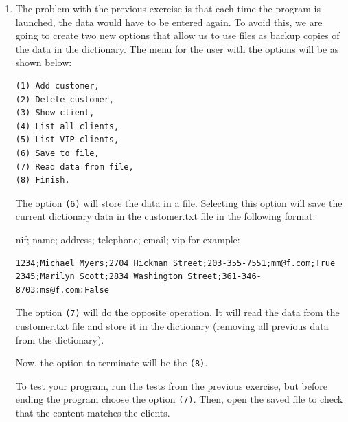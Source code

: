 \documentclass[
  fontsize=10pt,
  a4paper,
]{scrartcl}
\begin{document}
\begin{enumerate}
{def listCustomers(customers):
    print('List of customers')
    for key, value in customers.items():
        print(key, value['name'])
        
def listVIPCustomers(customers):
    print('List of VIP customers')
    for key, value in customers.items():
        if value['vip']:
            print(key, value['nombre'])

def main():
    customers = {}
    option = ''

    while option != '6':
        if option == '1':
            enterData(customers)
        if option == '2':
            deleteCustomer(customers)
        if option == '3':
            showCustomer(customers)
        if option == '4':
            listCustomers(customers)
        if option == '5':
            listVIPCustomers(customers)
        option = input('Option menu\n(1) Add customer\n(2) \ Delete customer\n(3) Show customer\n(4) List customers\n(5)\
       List VIP customers\n(6) Finish\n Choose an option:')
        
if __name__=='__main__':
    main()
    
}


\item The problem with the previous exercise is that each time the program is launched, the data would have to be entered again. To avoid this, we are going to create two new options that allow us to use files as backup copies of the data in the dictionary. The menu for the user with the options will be as shown below:

\begin{verbatim}
(1) Add customer,
(2) Delete customer,
(3) Show client,
(4) List all clients,
(5) List VIP clients,
(6) Save to file,
(7) Read data from file,
(8) Finish.
\end{verbatim}


The option \verb|(6)| will store the data in a file. Selecting this option will save the current dictionary data in the customer.txt file in the following format:

nif; name; address; telephone; email; vip
for example:
\begin{verbatim}
1234;Michael Myers;2704 Hickman Street;203-355-7551;mm@f.com;True
2345;Marilyn Scott;2834 Washington Street;361-346-8703:ms@f.com:False
\end{verbatim}

The option \verb|(7)| will do the opposite operation. It will read the data from the customer.txt file and store it in the dictionary (removing all previous data from the dictionary).

Now, the option to terminate will be the \verb|(8)|.

To test your program, run the tests from the previous exercise, but before ending the program choose the option \verb|(7)|. Then, open the saved file to check that the content matches the clients.



\end{enumerate}
\end{document}
